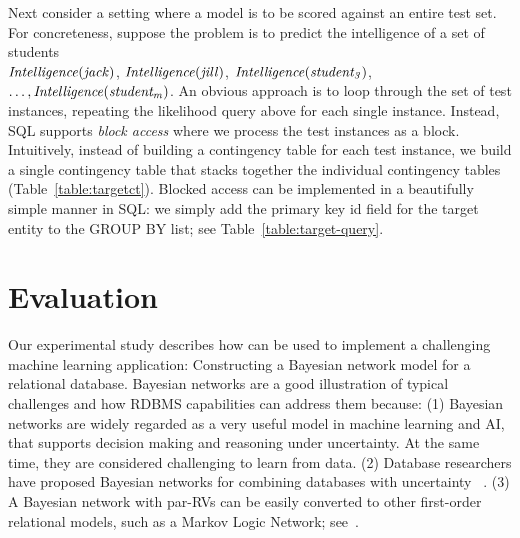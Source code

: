 %
Next consider a setting where a model is to be scored against an entire test set. 
For concreteness, suppose the problem is to predict the intelligence of a set of students\\
 $\it{Intelligence}(jack)$, $\it{Intelligence}(jill)$,
 $\it{Intelligence}(student_{3})$,\\$\ldots, \it{Intelligence}(student_{m})$.
An obvious approach is to loop through the set of test instances, repeating the likelihood query above for each single instance. Instead, 
 SQL supports {\em block access} where we process the test instances as a block. Intuitively, instead of building a contingency table for each test instance, we build a single contingency table that stacks together the individual contingency tables (Table~\ref{table:targetct}). Blocked access can be implemented in a beautifully simple manner in SQL: we simply add the primary key id field for the target entity to the GROUP BY list; see Table~\ref{table:target-query}. 

\section{Evaluation} 
Our experimental study describes how \FB  can be used to implement a challenging machine learning application: Constructing a Bayesian network model for a relational database. Bayesian networks are a good illustration of typical challenges and how RDBMS capabilities can address them because: (1) Bayesian networks are widely regarded as a very useful model %
 in machine learning and AI, that supports decision making and reasoning under uncertainty. At the same time, they are considered challenging to learn from data. (2) Database researchers have proposed Bayesian networks for combining databases with uncertainty%
~\cite{Wang2008}. (3) A Bayesian network with par-RVs can be easily converted to other first-order relational models, such as a Markov Logic Network; see~\cite{Domingos2009,Schulte2010}.


